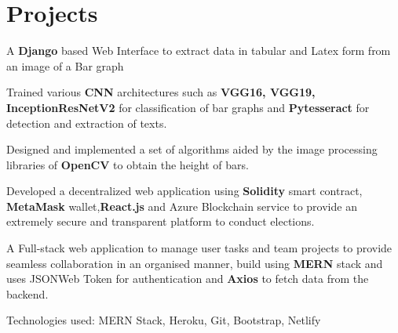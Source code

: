 \documentclass[]{deedy-resume-openfont}
\begin{document}
\begin{minipage}[t]{0.63\textwidth}


\section{Projects}

\vspace{\topsep} %
\begin{tightemize}
\item {A \textbf{Django} based Web Interface to extract data in tabular and Latex form from an image of a Bar graph} 
\item Trained various \textbf{CNN} architectures such as \textbf{VGG16, VGG19, InceptionResNetV2} for classification of bar graphs and \textbf{Pytesseract} for detection and extraction of texts.
\item Designed and implemented a set of algorithms aided by the image processing libraries of \textbf{OpenCV} to obtain the height of bars.
\end{tightemize}
\sectionsep

\begin{tightemize}
\item Developed a decentralized web application using \textbf{Solidity} smart contract, \textbf{MetaMask} wallet,\textbf{React.js} and Azure Blockchain service to provide an extremely secure and transparent platform to conduct elections.
\end{tightemize}
\sectionsep

\begin{tightemize}
\item A Full-stack web application to manage user tasks and team projects to provide seamless collaboration in an organised manner, build using \textbf{MERN} stack and uses JSONWeb Token for authentication and \textbf{Axios} to fetch data from the backend.
\item Technologies used: MERN Stack, Heroku, Git, Bootstrap, Netlify
\end{tightemize}
\sectionsep


\end{minipage}
\end{document}
